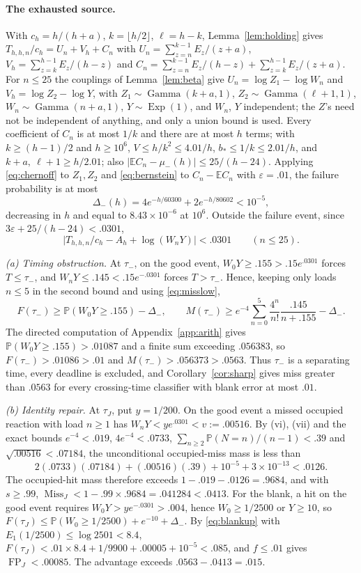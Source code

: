 \documentclass[11pt,a4paper]{article}
\theoremstyle{plain}
\theoremstyle{definition}
\theoremstyle{remark}
\newcommand{\E}{\mathbb E}
\newcommand{\Prob}{\mathbb P}
\newcommand{\FP}{\operatorname{FP}}
\newcommand{\Miss}{\operatorname{Miss}}
\newcommand{\Gam}{\operatorname{Gamma}}
\newcommand{\Ex}{\operatorname{Exp}}
\newcommand{\eps}{\varepsilon}
\begin{document}
\paragraph{The exhausted source.}
With $c_h=h/(h+a)$, $k=\lfloor h/2\rfloor$, $\ell=h-k$, Lemma~\ref{lem:holding} gives $T_{h,h,n}/c_h=U_n+V_h+C_n$ with $U_n=\sum_{z=n}^{k-1}E_z/(z+a)$, $V_h=\sum_{z=k}^{h-1}E_z/(h-z)$ and $C_n=\sum_{z=n}^{k-1}E_z/(h-z)+\sum_{z=k}^{h-1}E_z/(z+a)$. For $n\le25$ the couplings of Lemma~\ref{lem:beta} give $U_n=\log Z_1-\log W_n$ and $V_h=\log Z_2-\log Y$, with $Z_1\sim\Gam(k+a,1)$, $Z_2\sim\Gam(\ell+1,1)$, $W_n\sim\Gam(n+a,1)$, $Y\sim\Ex(1)$, and $W_n$, $Y$ independent; the $Z$'s need not be independent of anything, and only a union bound is used. Every coefficient of $C_n$ is at most $1/k$ and there are at most $h$ terms; with $k\ge(h-1)/2$ and $h\ge10^{6}$, $V\le h/k^2\le4.01/h$, $b_*\le1/k\le2.01/h$, and $k+a,\ \ell+1\ge h/2.01$; also $|\E C_n-\mu_-(h)|\le25/(h-24)$. Applying \eqref{eq:chernoff} to $Z_1,Z_2$ and \eqref{eq:bernstein} to $C_n-\E C_n$ with $\eps=.01$, the failure probability is at most
\begin{equation}\label{eq:deltaminus}
\Delta_-(h)=4e^{-h/60300}+2e^{-h/80602}<10^{-5},
\end{equation}
decreasing in $h$ and equal to $8.43\times10^{-6}$ at $10^{6}$. Outside the failure event, since $3\eps+25/(h-24)<.0301$,
\begin{equation}\label{eq:goodminus}
\bigl|T_{h,h,n}/c_h-A_h+\log(W_nY)\bigr|<.0301\qquad(n\le25).
\end{equation}

\emph{(a) Timing obstruction.} At $\tau_-$, on the good event, $W_0Y\ge.155>.15e^{.0301}$ forces $T\le\tau_-$, and $W_nY\le.145<.15e^{-.0301}$ forces $T>\tau_-$. Hence, keeping only loads $n\le5$ in the second bound and using \eqref{eq:misslow},
\[
F(\tau_-)\ge\Prob(W_0Y\ge.155)-\Delta_-,\qquad M(\tau_-)\ge e^{-4}\sum_{n=0}^5\frac{4^n}{n!}\frac{.145}{n+.155}-\Delta_- .
\]
The directed computation of Appendix~\ref{app:arith} gives $\Prob(W_0Y\ge.155)>.01087$ and a finite sum exceeding $.056383$, so $F(\tau_-)>.01086>.01$ and $M(\tau_-)>.056373>.0563$. Thus $\tau_-$ is a separating time, every deadline is excluded, and Corollary~\ref{cor:sharp} gives miss greater than $.0563$ for every crossing-time classifier with blank error at most $.01$.

\emph{(b) Identity repair.} At $\tau_J$, put $y=1/200$. On the good event a missed occupied reaction with load $n\ge1$ has $W_nY<ye^{.0301}<v:=.00516$. By (vi), (vii) and the exact bounds $e^{-4}<.019$, $4e^{-4}<.0733$, $\sum_{n\ge2}\Prob(N=n)/(n-1)<.39$ and $\sqrt{.00516}<.07184$, the unconditional occupied-miss mass is less than
\[
2(.0733)(.07184)+(.00516)(.39)+10^{-5}+3\times10^{-13}<.0126 .
\]
The occupied-hit mass therefore exceeds $1-.019-.0126=.9684$, and with $s\ge.99$, $\Miss_J<1-.99\times.9684=.041284<.0413$. For the blank, a hit on the good event requires $W_0Y>ye^{-.0301}>.004$, hence $W_0\ge1/2500$ or $Y\ge10$, so $F(\tau_J)\le\Prob(W_0\ge1/2500)+e^{-10}+\Delta_-$. By \eqref{eq:blankup} with $E_1(1/2500)\le\log2501<8.4$, $F(\tau_J)<.01\times8.4+1/9900+.00005+10^{-5}<.085$, and $f\le.01$ gives $\FP_J<.00085$. The advantage exceeds $.0563-.0413=.015$.
\end{document}
